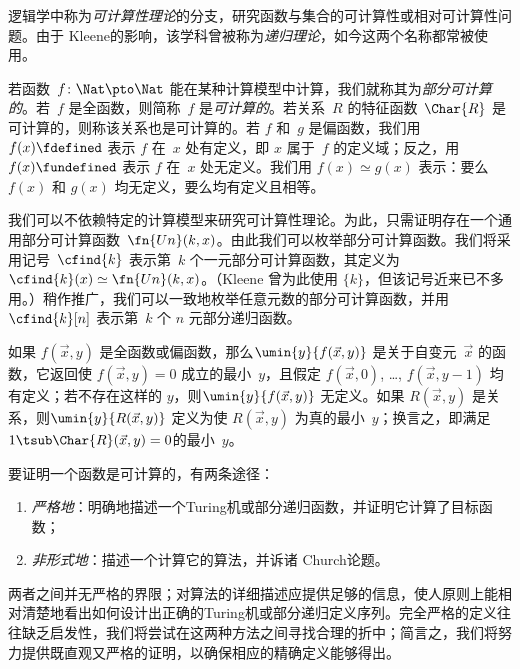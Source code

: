 \documentclass[../../../include/open-logic-section]{subfiles}
\begin{document}

逻辑学中称为\emph{可计算性理论}的分支，研究函数与集合的可计算性或相对可计算性问题。由于 Kleene的影响，该学科曾被称为\emph{递归理论}，如今这两个名称都常被使用。

若函数~$f\colon \Nat \pto \Nat$ 能在某种计算模型中计算，我们就称其为\emph{部分可计算的}。若~$f$ 是全函数，则简称~$f$ 是\emph{可计算的}。若关系~$R$ 的特征函数~$\Char{R}$ 是可计算的，则称该关系也是可计算的。若 $f$ 和~$g$ 是偏函数，我们用 $f(x) \fdefined$ 表示 $f$ 在~$x$ 处有定义，即 $x$ 属于~$f$ 的定义域；反之，用 $f(x) \fundefined$ 表示 $f$ 在~$x$ 处无定义。我们用 $f(x) \simeq g(x)$ 表示：要么 $f(x)$ 和 $g(x)$ 均无定义，要么均有定义且相等。

我们可以不依赖特定的计算模型来研究可计算性理论。为此，只需证明存在一个通用部分可计算函数~$\fn{Un}(k, x)$。由此我们可以枚举部分可计算函数。我们将采用记号~$\cfind{k}$ 表示第~$k$ 个一元部分可计算函数，其定义为$\cfind{k}(x) \simeq \fn{Un}(k, x)$。（Kleene 曾为此使用 $\{ k \}$，但该记号近来已不多用。）稍作推广，我们可以一致地枚举任意元数的部分可计算函数，并用 $\cfind{k}[n]$ 表示第~$k$ 个 $n$ 元部分递归函数。

如果 $f(\vec x, y)$ 是全函数或偏函数，那么$\umin{y}{f
(\vec x, y)}$ 是关于自变元~$\vec x$ 的函数，它返回使 $f(\vec x, y) = 0$ 成立的最小~$y$，且假定 $f(\vec x, 0)$, \dots, $f(\vec x, y-1)$ 均有定义；若不存在这样的 $y$，则$\umin{y}{f (\vec x, y)}$ 无定义。如果 $R(\vec x, y)$ 是关系，则$\umin{y}{R(\vec x, y)}$ 定义为使 $R(\vec x, y)$ 为真的最小~$y$；换言之，即满足$1 \tsub \Char{R}(\vec x, y) = 0$的最小~$y$。

要证明一个函数是可计算的，有两条途径：
\begin{enumerate}
\item \emph{严格地}：明确地描述一个Turing机或部分递归函数，并证明它计算了目标函数；
\item \emph{非形式地}：描述一个计算它的算法，并诉诸 Church论题。
\end{enumerate}

两者之间并无严格的界限；对算法的详细描述应提供足够的信息，使人原则上能相对清楚地看出如何设计出正确的Turing机或部分递归定义序列。完全严格的定义往往缺乏启发性，我们将尝试在这两种方法之间寻找合理的折中；简言之，我们将努力提供既直观又严格的证明，以确保相应的精确定义能够得出。
\end{document}
